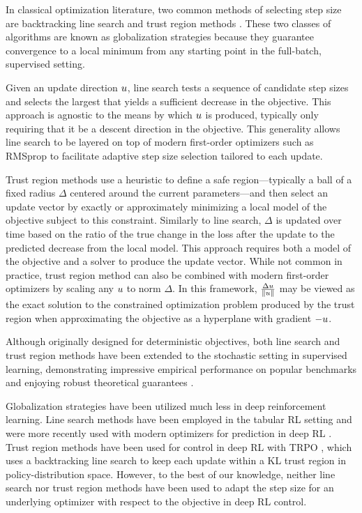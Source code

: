   In classical optimization literature, two common methods of selecting step size are backtracking line search and trust region methods \cite{nocedal2006numerical}. These two classes of algorithms are known as globalization strategies because they guarantee convergence to a local minimum from any starting point in the full-batch, supervised setting.
  
  Given an update direction $u$, line search tests a sequence of candidate step sizes and selects the largest that yields a sufficient decrease in the objective.
  This approach is agnostic to the means by which $u$ is produced, typically only requiring that it be a descent direction in the objective. This generality allows line search to be layered on top of modern first-order optimizers such as RMSprop \cite{Hinton2012lecture} to facilitate adaptive step size selection tailored to each update. 
  
  Trust region methods use a heuristic to define a safe region—typically a ball of a fixed radius $\Delta$ centered around the current parameters—and then select an update vector by exactly or approximately minimizing a local model of the objective subject to this constraint. Similarly to line search, $\Delta$ is updated over time based on the ratio of the true change in the loss after the update to the predicted decrease from the local model. This approach requires both a model of the objective and a solver to produce the update vector. While not common in practice, trust region method can also be combined with modern first-order optimizers by scaling any $u$ to norm $\Delta$. In this framework, $\frac{\Delta u}{\left \lVert u \right \rVert}$ may be viewed as the exact solution to the constrained optimization problem produced by the trust region when approximating the objective as a hyperplane with gradient $-u$.
  
  Although originally designed for deterministic objectives, both line search and trust region methods have been extended to the stochastic setting in supervised learning, demonstrating impressive empirical performance on popular benchmarks and enjoying robust theoretical guarantees \cite{lu2024towards,vaswani2019painless,galli2023monotone,shea2024so,vaswani2020adaptive,fox2024glocal,vaswani2025armijo,fan2023bisls,jiang2023adaptive}.
  
  Globalization strategies have been utilized much less in deep reinforcement learning. Line search methods have been employed in the tabular RL setting  and were more recently used with modern optimizers for prediction in deep RL \cite{PALS2026}. Trust region methods have been used for control in deep RL with TRPO \cite{schulman2015trust}, which uses a backtracking line search to keep each update within a KL trust region in policy-distribution space. However, to the best of our knowledge, neither line search nor trust region methods have been used to adapt the step size for an underlying optimizer with respect to the objective in deep RL control.
  
